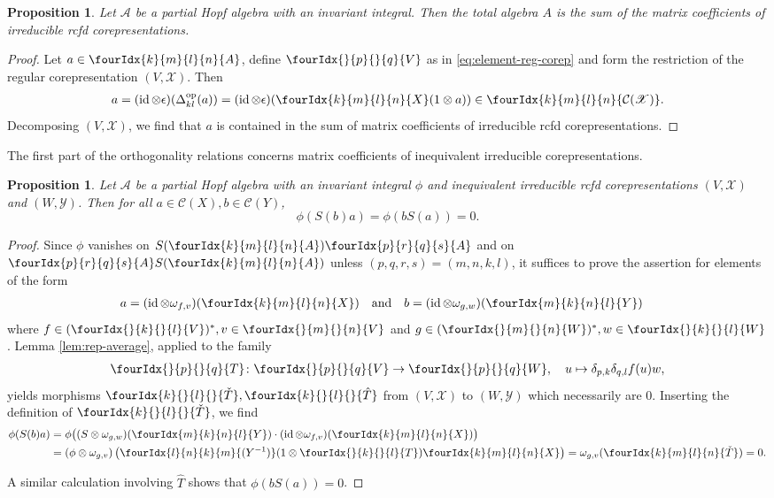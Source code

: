 \documentclass[10pt]{article}
\DeclareMathOperator{\id}{id}
\DeclareMathOperator{\op}{\mathrm{op}}
\newcommand{\dual}[1]{#1^{*}}
\newcommand{\Gr}[5]{\fourIdx{#2}{#4}{#3}{#5}{#1}}%
\newcommand{\Gru}[3]{\Gr{#1}{}{}{#2}{#3}}
\newcommand{\Grd}[3]{\Gr{#1}{#2}{#3}{}{}}
\newtheorem{Prop}[Theorem]{Proposition}
\theoremstyle{definition}
\numberwithin{equation}{section}
\begin{document}
\begin{Prop} \label{prop:rep-weak-pw} Let $\mathscr{A}$ be a partial
  Hopf algebra with an invariant integral. Then the total algebra $A$ is the sum
  of the matrix coefficients of irreducible rcfd corepresentations.
\end{Prop}
\begin{proof} 
  Let $a \in \Gr{A}{k}{l}{m}{n}$, define $\Gru{V}{p}{q}$ as in
  \eqref{eq:element-reg-corep} and form the restriction of the regular
  corepresentation $(V,\mathscr{X})$. Then
  \begin{align*}
    a = (\id \otimes \epsilon)(\Delta^{\op}_{kl}(a)) =
    (\id \otimes \epsilon)(\Gr{X}{k}{l}{m}{n}(1 \otimes a)) \in
    \Gr{\mathcal{C}(\mathscr{X})}{k}{l}{m}{n}.
  \end{align*}
  Decomposing $(V,\mathscr{X})$, we find that
  $a$ is contained in the sum of matrix coefficients of irreducible
rcfd  corepresentations.
\end{proof}


The first part of the orthogonality relations concerns matrix
coefficients of inequivalent irreducible corepresentations. 
\begin{Prop} \label{prop:rep-orthogonality-1} Let $\mathcal{A}$ be a
  partial Hopf algebra with an invariant integral $\phi$ and inequivalent
  irreducible rcfd corepresentations $(V,\mathscr{X})$ and
  $(W,\mathscr{Y})$.  Then  for all
  $a\in \mathcal{C}(X), b \in \mathcal{C}(Y)$,
  \[\phi(S(b)a) = \phi(bS(a))=0.\]
\end{Prop}
\begin{proof}
Since $\phi$ vanishes on $S(\Gr{A}{k}{l}{m}{n})\Gr{A}{p}{q}{r}{s}$ and
on $\Gr{A}{p}{q}{r}{s}S(\Gr{A}{k}{l}{m}{n})$ unless
$(p,q,r,s) = (m,n,k,l)$, it suffices to prove the assertion for  elements of the form
\begin{align*}
  a&=(\id \otimes \omega_{f,v})(\Gr{X}{k}{l}{m}{n})  && \text{and} &
  b&=(\id \otimes \omega_{g,w})(\Gr{Y}{m}{n}{k}{l})
\end{align*}
where $f\in \dual{(\Gru{V}{k}{l})}, v \in \Gru{V}{m}{n}$ and $g \in
\dual{(\Gru{W}{m}{n})}, w \in \Gru{W}{k}{l}$.  Lemma
\ref{lem:rep-average}, applied to the family
  \begin{align*}
    \Gru{T}{p}{q} \colon \Gru{V}{p}{q} \to \Gru{W}{p}{q}, \quad u
    \mapsto  \delta_{p,k}\delta_{q,l}  f(u)w,
  \end{align*}
  yields morphisms $\Grd{\check{T}}{k}{l},\Grd{\hat{T}}{k}{l}$ from $(V,\mathscr{X})$ to
  $(W,\mathscr{Y})$ which necessarily are $0$. Inserting the
  definition of $\Grd{\check{T}}{k}{l}$, we find
  \begin{align*}
    \phi(S(b)a) &= \phi\big((S \otimes
    \omega_{g,w})(\Gr{Y}{m}{n}{k}{l}) \cdot (\id \otimes
    \omega_{f,v})(\Gr{X}{k}{l}{m}{n})\big) \\ &= (\phi \otimes \omega_{g,v})\left(\Gr{(Y^{-1})}{l}{k}{n}{m}(1 \otimes
      \Gru{T}{k}{l} )     \Gr{X}{k}{l}{m}{n}\right) 
    = \omega_{g,v}( \Gr{\check{T}}{k}{l}{m}{n}) = 0.
  \end{align*}
  
  A similar calculation involving $\hat{T}$ shows that
  $\phi(bS(a))=0$.  
\end{proof}
\end{document}
